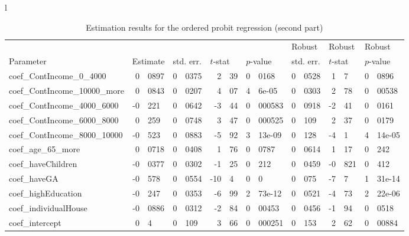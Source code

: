 \documentclass[12pt,a4paper]{article}
\begin{document}
\begin{sidewaystable}[htb]
\caption{\label{tab:ordered2}Estimation results for the ordered probit
  regression (second part)}
  \begin{tabular}{l}
\begin{tabular}{lr@{.}lr@{.}lr@{.}lr@{.}lr@{.}lr@{.}lr@{.}l}
                      &   \multicolumn{2}{l}{}    & \multicolumn{2}{l}{} & \multicolumn{2}{l}{}  &     \multicolumn{2}{l}{} &   \multicolumn{2}{l}{Robust}    & \multicolumn{2}{l}{Robust}  &     \multicolumn{2}{l}{Robust}   \\
Parameter      & \multicolumn{2}{l}{Estimate}  &
\multicolumn{2}{l}{std. err.}  &  \multicolumn{2}{l}{$t$-stat}  &   \multicolumn{2}{l}{$p$-value}  &
\multicolumn{2}{l}{std. err.}  &  \multicolumn{2}{l}{$t$-stat}  &   \multicolumn{2}{l}{$p$-value}   \\
\hline
coef\_ContIncome\_0\_4000     &  0&0897 &   0&0375 &    2&39 &   0&0168 &        0&0528 &          1&7 &        0&0896 \\
coef\_ContIncome\_10000\_more &  0&0843 &   0&0207 &    4&07 &  4&6e-05 &        0&0303 &         2&78 &       0&00538 \\
coef\_ContIncome\_4000\_6000  &  -0&221 &   0&0642 &   -3&44 & 0&000583 &        0&0918 &        -2&41 &        0&0161 \\
coef\_ContIncome\_6000\_8000  &   0&259 &   0&0748 &    3&47 & 0&000525 &         0&109 &         2&37 &        0&0179 \\
coef\_ContIncome\_8000\_10000 &  -0&523 &   0&0883 &   -5&92 & 3&13e-09 &         0&128 &         -4&1 &      4&14e-05 \\
coef\_age\_65\_more           &  0&0718 &   0&0408 &    1&76 &   0&0787 &        0&0614 &         1&17 &         0&242 \\
coef\_haveChildren          & -0&0377 &   0&0302 &   -1&25 &    0&212 &        0&0459 &       -0&821 &         0&412 \\
coef\_haveGA                &  -0&578 &   0&0554 &   -10&4 &      0&0 &         0&075 &         -7&7 &      1&31e-14 \\
coef\_highEducation         &  -0&247 &   0&0353 &   -6&99 & 2&73e-12 &        0&0521 &        -4&73 &      2&22e-06 \\
coef\_individualHouse       & -0&0886 &   0&0312 &   -2&84 &  0&00453 &        0&0456 &        -1&94 &        0&0518 \\
coef\_intercept             &     0&4 &    0&109 &    3&66 & 0&000251 &         0&153 &         2&62 &       0&00884 \\

\end{tabular}
\end{tabular}
\end{sidewaystable}
\end{document}
